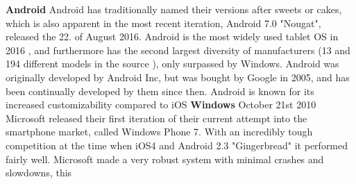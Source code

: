 %   
\textbf{Android}\newline %
Android has traditionally named their versions after sweets or cakes, which is also apparent in the most recent iteration, Android 7.0 "Nougat", released the 22. of August 2016\cite{android:latest_version}. Android is the most widely used tablet OS in 2016 \cite{netmarketshare:tablet_os}, and furthermore has the second largest diversity of manufacturers (13 and 194 different models in the source \cite{edbpriser:android}), only surpassed by Windows. Android was originally developed by Android Inc, but was bought by Google in 2005\cite{uk.complex:google_buys_android}, and has been continually developed by them since then. Android is known for its increased customizability compared to iOS
\textbf{Windows}\newline
October 21st 2010 Microsoft released their first iteration of their current attempt into the smartphone market, called Windows Phone 7.\cite{techradar:winphone7_releasedate} With an incredibly tough competition at the time when iOS4 and Android 2.3 "Gingerbread" it performed fairly well. Microsoft made a very robust system with minimal crashes and slowdowns, this 


